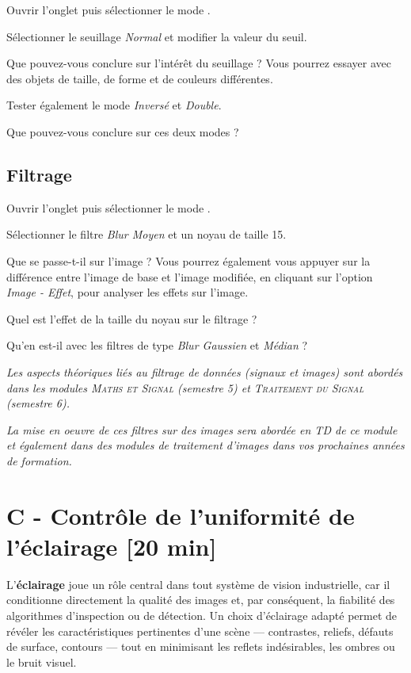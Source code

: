 \Manip Ouvrir l'onglet  puis sélectionner le mode .

\Manip Sélectionner le seuillage \textsl{Normal} et modifier la valeur du seuil.

\Quest Que pouvez-vous conclure sur l'intérêt du seuillage ? Vous pourrez essayer avec des objets de taille, de forme et de couleurs différentes.

\Manip Tester également le mode \textsl{Inversé} et \textsl{Double}.

\Quest Que pouvez-vous conclure sur ces deux modes ?
 

\subsection{Filtrage}

\Manip Ouvrir l'onglet  puis sélectionner le mode .

\Manip Sélectionner le filtre \textsl{Blur Moyen} et un noyau de taille 15.

\Quest Que se passe-t-il sur l'image ? Vous pourrez également vous appuyer sur la différence entre l'image de base et l'image modifiée, en cliquant sur l'option \textsl{Image - Effet}, pour analyser les effets sur l'image.

\Quest Quel est l'effet de la taille du noyau sur le filtrage ?

\Quest Qu'en est-il avec les filtres de type \textsl{Blur Gaussien} et \textsl{Médian} ? 

\vfill

\textit{Les aspects théoriques liés au filtrage de données (signaux et images) sont abordés dans les modules \textsc{Maths et Signal} (semestre 5) et \textsc{Traitement du Signal} (semestre 6).}

\textit{La mise en oeuvre de ces filtres sur des images sera abordée en TD de ce module et également dans des modules de traitement d'images dans vos prochaines années de formation.}


\newpage
\section{C - Contrôle de l'uniformité de l'éclairage {[20 min]}}

L'\textbf{éclairage} joue un rôle central dans tout système de vision industrielle, car il conditionne directement la qualité des images et, par conséquent, la fiabilité des algorithmes d'inspection ou de détection. Un choix d'éclairage adapté permet de révéler les caractéristiques pertinentes d'une scène — contrastes, reliefs, défauts de surface, contours — tout en minimisant les reflets indésirables, les ombres ou le bruit visuel. 

